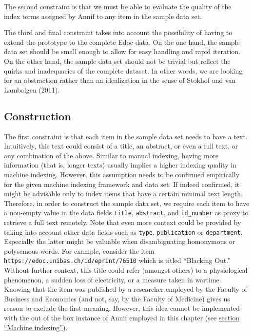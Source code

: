 The second constraint is that we must be able to evaluate the quality of
the index terms assigned by Annif to any item in the sample data set.

The third and final constraint takes into account the possibility of
having to extend the prototype to the complete Edoc data. On the one
hand, the sample data set should be small enough to allow for easy
handling and rapid iteration. On the other hand, the sample data set
should not be trivial but reflect the quirks and inadequacies of the
complete dataset. In other words, we are looking for an abstraction
rather than an idealization in the sense of Stokhof and van Lambalgen
(2011).

\hypertarget{construction}{%
\subsection{Construction}\label{construction}}

The first constraint is that each item in the sample data set needs to
have a text. Intuitively, this text could consist of a title, an
abstract, or even a full text, or any combination of the above. Similar
to manual indexing, having more information (that is, longer texts)
usually implies a higher indexing quality in machine indexing. However,
this assumption needs to be confirmed empirically for the given machine
indexing framework and data set. If indeed confirmed, it might be
advisable only to index items that have a certain minimal text length.
Therefore, in order to construct the sample data set, we require each
item to have a non-empty value in the data fields \texttt{title},
\texttt{abstract}, and \texttt{id\_number} as proxy to retrieve a full
text remotely. Note that even more context could be provided by taking
into account other data fields such as \texttt{type},
\texttt{publication} or \texttt{department}. Especially the latter might
be valuable when disambiguating homonymous or polysemous words. For
example, consider the item
\texttt{https://edoc.unibas.ch/id/eprint/76510} which is titled
``Blacking Out.'' Without further context, this title could refer
(amongst others) to a physiological phenomenon, a sudden loss of
electricity, or a measure taken in wartime. Knowing that the item was
published by a researcher employed by the Faculty of Business and
Economics (and not, say, by the Faculty of Medicine) gives us reason to
exclude the first meaning. However, this idea cannot be implemented with
the out of the box instance of Annif employed in this chapter (see
\protect\hyperlink{machine-indexing}{section ``Machine indexing''}).

